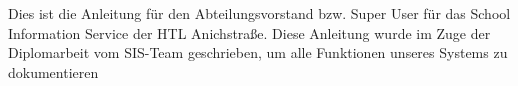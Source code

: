 Dies ist die Anleitung für den Abteilungsvorstand bzw. Super User für das School Information Service der HTL Anichstraße. Diese Anleitung wurde im Zuge der Diplomarbeit vom SIS-Team geschrieben, um alle Funktionen unseres Systems zu dokumentieren